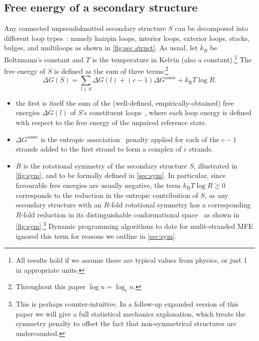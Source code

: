 \documentclass[11pt,letterpaper]{article}  \usepackage[margin=1in]{geometry}
\theoremstyle{definition}  \newtheorem{Definition}[theorem]{Definition}
\begin{document}
\subsection{Free energy of a secondary structure}
Any connected unpseudoknotted secondary structure $S$ can be decomposed into different loop types~\cite{tinoco,santa,mathews1999expanded}: namely hairpin loops, interior loops, exterior loops, stacks, bulges, and multiloops as shown in \cref{fig:sec struct}. 
As usual, let  $k_B$ be Boltzmann's constant and $T$ is the temperature in Kelvin (also a constant).\footnote{All results hold if we assume these are typical values from physics, or just 1 in appropriate units.} 
The free energy of $S$ is defined as the sum of three terms:\footnote{Throughout this paper $\log n = \log_\mathrm{e} n$.}
\begin{equation}\label{eq:DGss}
	\Delta G(S) =  \sum_{l\in S} \Delta G(l) + (c-1)\Delta G^{\textrm{assoc}} + k_\mathrm{B} T \log R.
\end{equation}  
\begin{itemize}
	\item the first is itself the sum of the (well-defined, empirically-obtained) free energies $\Delta G(l)$ of $S$'s constituent loops~\cite{dirks2007thermodynamic}, where each loop energy is defined with respect to the free energy of the unpaired reference state.
	\item $\Delta G^{\textrm{assoc}} $ is the entropic association~\cite{dirks2007thermodynamic} penalty applied for each of the $c-1$ strands added to the first strand to form a complex of $c$ strands.
	\item $R$ is the rotational symmetry of the secondary structure $S$,  illustrated in \cref{fig:sym}, and to be formally defined  in \cref{sec:sym}.  In particular, since favourable free energies are usually negative, the term  $k_\mathrm{B} T \log R \geq 0$ corresponds to the reduction in the entropic contribution of $S$, as any secondary structure with an $R$-fold rotational symmetry has a corresponding $R$-fold reduction in its distinguishable conformational space~\cite{dirks2007thermodynamic} as shown in \cref{fig:sym}.\footnote{This is perhaps counter-intuitive. In a follow-up expanded version of this paper we will give a full statistical mechanics explanation, which treats the symmetry penalty to offset the fact that non-symmetrical structures are undercounted.} Dynamic programming algorithms to date for mulit-stranded MFE ignored this term for reasons we outline in \cref{sec:sym}.
\end{itemize}
\end{document}
